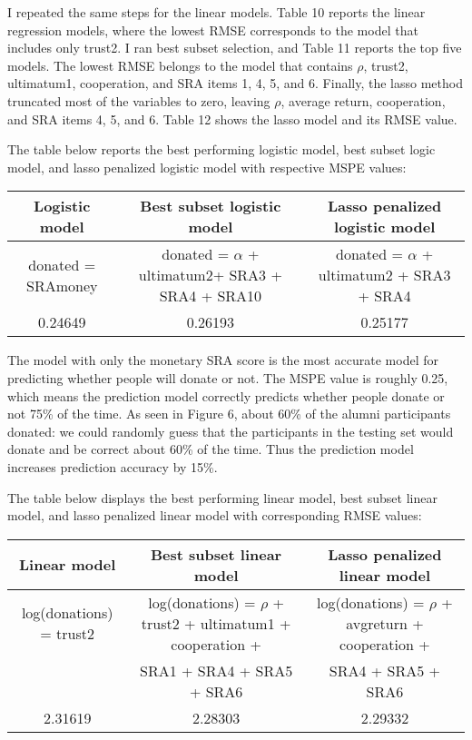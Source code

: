 \documentclass[12pt]{article}
\begin{document}
I repeated the same steps for the linear models. Table 10 reports the linear regression models, where the lowest RMSE corresponds to the model that includes only trust2. I ran best subset selection, and Table 11 reports the top five models. The lowest RMSE belongs to the model that contains \(\rho\), trust2, ultimatum1, cooperation, and SRA items 1, 4, 5, and 6. Finally, the lasso method truncated most of the variables to zero, leaving \(\rho\), average return, cooperation, and SRA items 4, 5, and 6. Table 12 shows the lasso model and its RMSE value.

The table below reports the best performing logistic model, best subset logic model, and lasso penalized logistic model with respective MSPE values:

\vspace{6mm} \begin{adjustbox}{width=\textwidth}
\begin{tabular}{ c | c | c }
\hline \hline
Logistic model & Best subset logistic model & Lasso penalized logistic model \\ 
\hline
\small donated = SRAmoney & donated = \(\alpha\) + ultimatum2+ SRA3 + SRA4 + SRA10 & donated = \(\alpha\) + ultimatum2 + SRA3 + SRA4 \\
 \hline
 0.24649 & 0.26193 & 0.25177 \\  
 \hline \hline
\end{tabular}
\end{adjustbox}

\vspace{4mm} The model with only the monetary SRA score is the most accurate model for predicting whether people will donate or not. The MSPE value is roughly 0.25, which means the prediction model correctly predicts whether people donate or not 75\% of the time. As seen in Figure 6, about 60\% of the alumni participants donated: we could randomly guess that the participants in the testing set would donate and be correct about 60\% of the time. Thus the prediction model increases prediction accuracy by 15\%.
 
The table below displays the best performing linear model, best subset linear model, and lasso penalized linear model with corresponding RMSE values:
 
\vspace{6mm} \begin{adjustbox}{width=\textwidth}
\begin{tabular}{ c | c | c }
\hline \hline
Linear model & Best subset linear model & Lasso penalized linear model \\
\hline
log(donations) = trust2 & log(donations) = \(\rho\) + trust2 + ultimatum1 + cooperation + & log(donations) = \(\rho\) + avgreturn + cooperation + \\
\small & SRA1 + SRA4 + SRA5 + SRA6 & SRA4 + SRA5 + SRA6 \\
\hline
2.31619 & 2.28303 & 2.29332 \\
\hline \hline
\end{tabular}
\end{adjustbox}
\end{document}
